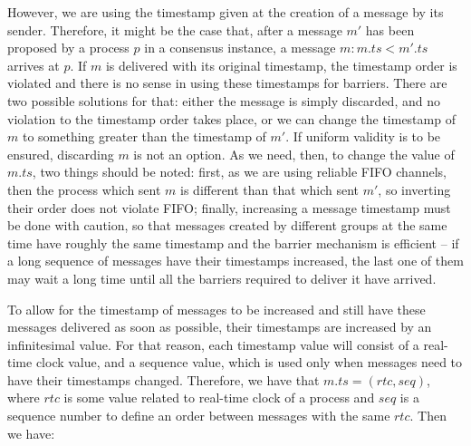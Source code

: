 \documentclass[times, 10pt]{article}
\begin{document}
However, we are using the timestamp given at the creation of a message by its sender. Therefore, it might be the case that, after a message $m'$ has been proposed by a process $p$ in a consensus instance, a message $m : m.ts < m'.ts$ arrives at $p$. If $m$ is delivered with its original timestamp, the timestamp order is violated and there is no sense in using these timestamps for barriers. There are two possible solutions for that: either the message is simply discarded, and no violation to the timestamp order takes place, or we can change the timestamp of $m$ to something greater than the timestamp of $m'$. If uniform validity is to be ensured, discarding $m$ is not an option. As we need, then, to change the value of $m.ts$, two things should be noted: first, as we are using reliable FIFO channels, then the process which sent $m$ is different than that which sent $m'$, so inverting their order does not violate FIFO; finally, increasing a message timestamp must be done with caution, so that messages created by different groups at the same time have roughly the same timestamp and the barrier mechanism is efficient -- if a long sequence of messages have their timestamps increased, the last one of them may wait a long time until all the barriers required to deliver it have arrived.


To allow for the timestamp of messages to be increased and still have these messages delivered as soon as possible, their timestamps are increased by an infinitesimal value. For that reason, each timestamp value will consist of a real-time clock value, and a sequence value, which is used only when messages need to have their timestamps changed. Therefore, we have that $m.ts = (rtc, seq)$, where $rtc$ is some value related to real-time clock of a process and $seq$ is a sequence number to define an order between messages with the same $rtc$. Then we have:
\end{document}
